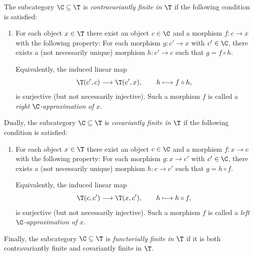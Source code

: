 \documentclass[a4paper]{amsart}
\begin{document}
\begin{definition}
  The subcategory $\C\subseteq\T$ is \emph{contravariantly finite in $\T$} if
  the following condition is satisfied:
  \begin{enumerate}
  \item For each object $x\in\T$ there exist an object $c\in\C$ and a morphism
    $f\colon c\to x$ with the following property: For each morphism $g\colon
    c'\to x$ with $c'\in\C$, there exists a (not necessarily unique) morphism
    $h\colon c'\to c$ such that $g=f\circ h$.
    \begin{center}
    \end{center}
    Equivalently, the induced linear map
    \[
      \T(c',c)\longrightarrow\T(c',x),\qquad h\longmapsto f\circ h,
    \]
    is surjective (but not necessarily injective). Such a morphism $f$ is called
    a \emph{right $\C$-approximation of $x$}.
  \end{enumerate}
  Dually, the subcategory $\C\subseteq\T$ is \emph{covariantly finite in $\T$}
  if the following condition is satisfied:
  \begin{enumerate}
  \item For each object $x\in\T$ there exist an object $c\in\C$ and a morphism
    $f\colon x\to c$ with the following property: For each morphism $g\colon
    x\to c'$ with $c'\in\C$, there exists a (not necessarily unique) morphism
    $h\colon c\to c'$ such that $g=h\circ f$.
    \begin{center}
    \end{center}
    Equivalently, the induced linear map
    \[
      \T(c,c')\longrightarrow\T(x,c'),\qquad h\longmapsto h\circ f,
    \]
    is surjective (but not necessarily injective). Such a morphism $f$ is called
    a \emph{left $\C$-approximation of $x$}.
  \end{enumerate}
  Finally, the subcategory $\C\subseteq\T$ is \emph{functorially finite in $\T$}
  if it is both contravariantly finite and covariantly finite in $\T$.
\end{definition}
\end{document}
